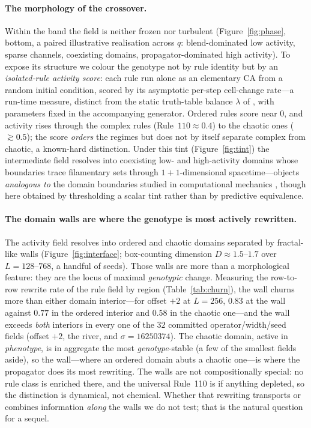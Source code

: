\documentclass[man,12pt,floatsintext]{apa7}
\newcommand{\secref}[1]{\emph{\nameref{#1}}}
\begin{document}
\paragraph{The morphology of the crossover.}
Within the band the field is neither frozen nor turbulent (Figure~\ref{fig:phase},
bottom, a paired illustrative realisation across $q$: blend-dominated low
activity, sparse channels, coexisting domains, propagator-dominated high
activity). To expose its structure we colour the genotype not by rule identity
but by an \emph{isolated-rule activity score}: each rule run alone as an
elementary CA from a random initial condition, scored by its asymptotic per-step
cell-change rate---a run-time measure, distinct from the static truth-table
balance $\lambda$ of \secref{sec:lambda}, with parameters fixed in the
accompanying generator. Ordered rules score near $0$, and activity rises through
the complex rules (Rule~$110 \approx 0.4$) to the chaotic ones ($\gtrsim 0.5$);
the score \emph{orders} the regimes but does not by itself separate complex from
chaotic, a known-hard distinction. Under this tint (Figure~\ref{fig:tint}) the
intermediate field resolves into coexisting low- and high-activity domains whose
boundaries trace filamentary sets through $1{+}1$-dimensional spacetime---objects
\emph{analogous to} the domain boundaries studied in computational mechanics
\parencite{crutchfield1989inferring,shalizi2001computational}, though here
obtained by thresholding a scalar tint rather than by predictive equivalence.

\paragraph{The domain walls are where the genotype is most actively rewritten.}
The activity field resolves into ordered and chaotic domains separated by
fractal-like walls (Figure~\ref{fig:interface}; box-counting dimension
$D \approx 1.5$--$1.7$ over $L = 128$--$768$, a handful of seeds). Those walls are
more than a morphological feature: they are the locus of maximal \emph{genotypic}
change. Measuring the row-to-row rewrite rate of the rule field by region
(Table~\ref{tab:churn}), the wall churns more than either domain interior---for
offset $+2$ at $L = 256$, $0.83$ at the wall against $0.77$ in the ordered interior
and $0.58$ in the chaotic one---and the wall exceeds \emph{both} interiors in every
one of the $32$ committed operator/width/seed fields (offset $+2$, the river, and
$\sigma = 16250374$). The chaotic domain, active in \emph{phenotype}, is in
aggregate the most \emph{genotype}-stable (a few of the smallest fields aside), so
the wall---where an ordered domain abuts a chaotic one---is where the propagator
does its most rewriting. The walls are not compositionally special: no rule class
is enriched there, and the universal Rule~110 is if anything depleted, so the
distinction is dynamical, not chemical. Whether that rewriting transports or
combines information \emph{along} the walls we do not test; that is the natural
question for a sequel.
\end{document}
